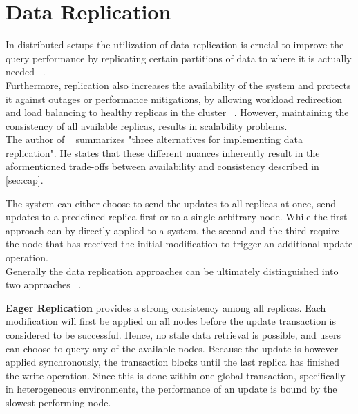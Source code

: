 


\section{Data Replication}

In distributed setups the utilization of data replication is crucial to improve the query performance
by replicating certain partitions of data to where it is actually needed ~\cite{cloudpart_2012}.\\
Furthermore, replication also increases the availability of the system and protects it against outages or performance mitigations,
by allowing workload redirection and load balancing to healthy replicas in the cluster ~\cite{quorums:2003}.
However, maintaining the consistency of all available replicas, results in scalability problems.\\
The author of ~\cite{abadi2012} summarizes "three alternatives for implementing data replication".
He states that these different nuances inherently result in the aformentioned trade-offs between availability and consistency described in \ref{sec:cap}.

The system can either choose to send the updates to all replicas at once, send updates to a predefined replica first or to a single arbitrary node.
 While the first approach can by directly applied to a system, the second and the third require the node that has received the initial modification to trigger an additional update operation.
\\
Generally the data replication approaches can be ultimately distinguished into two approaches ~\cite{gray:1996}.

\textbf{Eager Replication} provides a strong consistency among all replicas. Each modification will first be applied on all nodes
before the update transaction is considered to be successful. Hence, no stale data retrieval is possible, and users can choose to query any of the available nodes.
Because the update is however applied synchronously, the transaction blocks until the last replica has finished the write-operation. 
Since this is done within one global transaction, specifically in heterogeneous environments, the performance of an update is bound by the slowest performing node.\\

